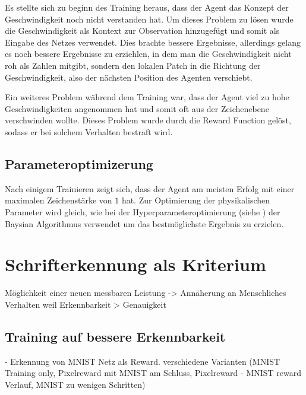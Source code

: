 Es stellte sich zu beginn des Training heraus, dass der Agent das Konzept der
Geschwindigkeit noch nicht verstanden hat. Um dieses Problem zu lösen wurde die %
Geschwindigkeit als Kontext zur Observation hinzugefügt und somit als Eingabe   %
des Netzes verwendet. Dies brachte bessere Ergebnisse, allerdings gelang es noch
bessere Ergebnisse zu erziehlen, in dem man die Geschwindigkeit nicht roh als
Zahlen mitgibt, sondern den lokalen Patch in die Richtung der Geschwindigkeit,
also der nächsten Position des Agenten verschiebt.

Ein weiteres Problem während dem Training war, dass der Agent viel zu hohe
Geschwindigkeiten angenommen hat und somit oft aus der Zeichenebene verschwinden
wollte. Dieses Problem wurde durch die Reward Function gelöst, sodass er bei
solchem Verhalten bestraft wird.


\subsection*{Parameteroptimizerung}
Nach einigem Trainieren zeigt sich, dass der Agent am meisten Erfolg mit einer
maximalen Zeichenstärke von $1$ hat. Zur Optimierung der physikalischen
Parameter wird gleich, wie bei der Hyperparameteroptimierung (siehe %
) der Baysian Algorithmus verwendet um
das bestmöglichste Ergebnis zu erzielen.



\section{Schrifterkennung als Kriterium}
Möglichkeit einer neuen messbaren Leistung
-> Annäherung an Menschliches Verhalten weil Erkennbarkeit > Genauigkeit


\subsection*{Training auf bessere Erkennbarkeit}
- Erkennung von MNIST Netz als Reward. 
verschiedene Varianten (MNIST Training only, Pixelreward mit MNIST am Schluss, Pixelreward - MNIST reward Verlauf, MNIST zu wenigen Schritten)


